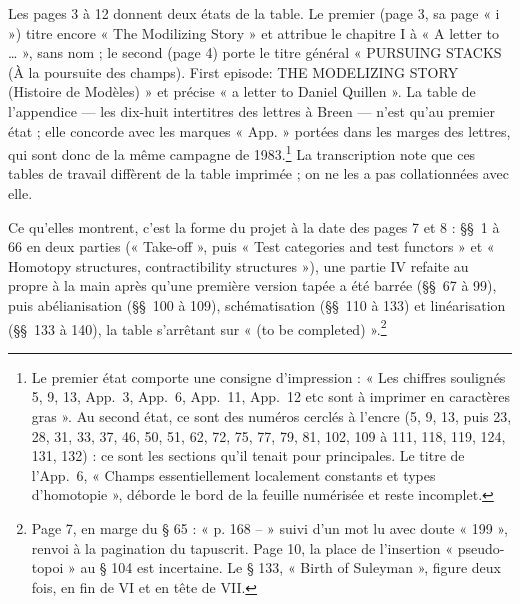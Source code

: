 \documentclass[11pt,a4paper]{article}
\begin{document}
Les pages 3 à 12 donnent deux états de la table. Le premier (page 3, sa
page « i ») titre encore « The Modilizing Story » et attribue le chapitre I à
« A letter to … », sans nom ; le second (page 4) porte le titre général
« PURSUING STACKS (À la poursuite des champs). First episode: THE MODELIZING
STORY (Histoire de Modèles) » et précise « a letter to Daniel Quillen ». La
table de l'appendice --- les dix-huit intertitres des lettres à Breen ---
n'est qu'au premier état ; elle concorde avec les marques « App. » portées
dans les marges des lettres, qui sont donc de la même campagne de 1983.\footnote{Le premier état comporte une consigne d'impression : « Les chiffres
soulignés 5, 9, 13, App.~3, App.~6, App.~11, App.~12 etc sont à imprimer en
caractères gras ». Au second état, ce sont des numéros cerclés à l'encre
(5, 9, 13, puis 23, 28, 31, 33, 37, 46, 50, 51, 62, 72, 75, 77, 79, 81, 102,
109 à 111, 118, 119, 124, 131, 132) : ce sont les sections qu'il tenait pour
principales. Le titre de l'App.~6, « Champs essentiellement localement
constants et types d'homotopie », déborde le bord de la feuille numérisée et
reste incomplet.}
La transcription note que ces tables de travail diffèrent de la table
imprimée ; on ne les a pas collationnées avec elle.

Ce qu'elles montrent, c'est la forme du projet à la date des pages 7 et 8 :
§§~1 à 66 en deux parties (« Take-off », puis « Test categories and test
functors » et « Homotopy structures, contractibility structures »), une
partie IV refaite au propre à la main après qu'une première version tapée a
été barrée (§§~67 à 99), puis abélianisation (§§~100 à 109),
schématisation (§§~110 à 133) et linéarisation (§§~133 à 140), la table
s'arrêtant sur « (to be completed) ».\footnote{Page 7, en marge du § 65 :
« p. 168 -- » suivi d'un mot lu avec doute « 199 », renvoi à la pagination
du tapuscrit. Page 10, la place de l'insertion « pseudo-topoi » au § 104 est
incertaine. Le § 133, « Birth of Suleyman », figure deux fois, en fin de VI
et en tête de VII.}
\end{document}
